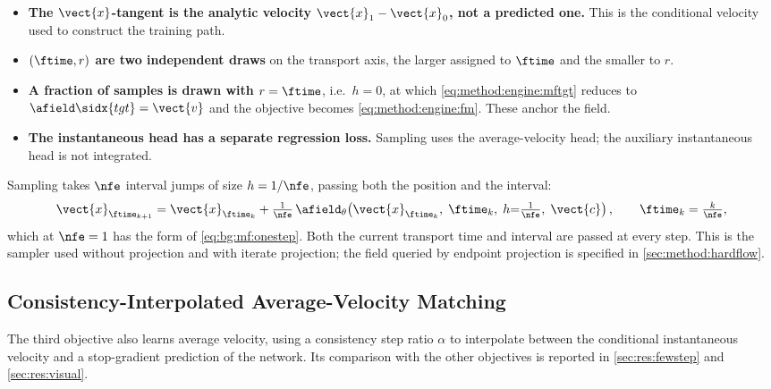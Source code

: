 \begin{itemize}
  \item \textbf{The $\vect{x}$-tangent is the analytic velocity $\vect{x}_{1}-\vect{x}_{0}$, not a
    predicted one.} This is the conditional velocity used to construct the training path.
  \item \textbf{$(\ftime,r)$ are two independent draws} on the transport axis, the larger
    assigned to $\ftime$ and the smaller to $r$.
  \item \textbf{A fraction of samples is drawn with $r = \ftime$}, i.e.\ $h=0$, at which
    \eqref{eq:method:engine:mftgt} reduces to $\afield\sidx{tgt} = \vect{v}$ and the objective
    becomes \eqref{eq:method:engine:fm}. These anchor the field.
  \item \textbf{The instantaneous head has a separate regression loss.} Sampling uses the
    average-velocity head; the auxiliary instantaneous head is not integrated.
\end{itemize}

Sampling takes $\nfe$ interval jumps of size $h=1/\nfe$, passing both the position and the
interval:
\begin{equation}\label{eq:method:engine:mfsample}
  \vect{x}_{\ftime_{k+1}} = \vect{x}_{\ftime_{k}}
    + \tfrac{1}{\nfe}\,\afield_{\theta}\!\left(\vect{x}_{\ftime_{k}},\;\ftime_{k},\;h{=}\tfrac{1}{\nfe},\;\vect{c}\right),
  \qquad \ftime_{k} = \tfrac{k}{\nfe},
\end{equation}
which at $\nfe=1$ has the form of \eqref{eq:bg:mf:onestep}. Both the current transport time
and interval are passed at every step. This is the sampler used without projection and with iterate
projection; the field queried by endpoint projection is specified in \autoref{sec:method:hardflow}.

\subsection{Consistency-Interpolated Average-Velocity Matching}\label{sec:method:alphaflow}

The third objective \parencite{zhang2025alphaflow} also learns average velocity, using a consistency
step ratio $\alpha$ to interpolate between the conditional instantaneous velocity and a
stop-gradient prediction of the network. Its comparison with the other objectives is reported in
\autoref{sec:res:fewstep} and \autoref{sec:res:visual}.

